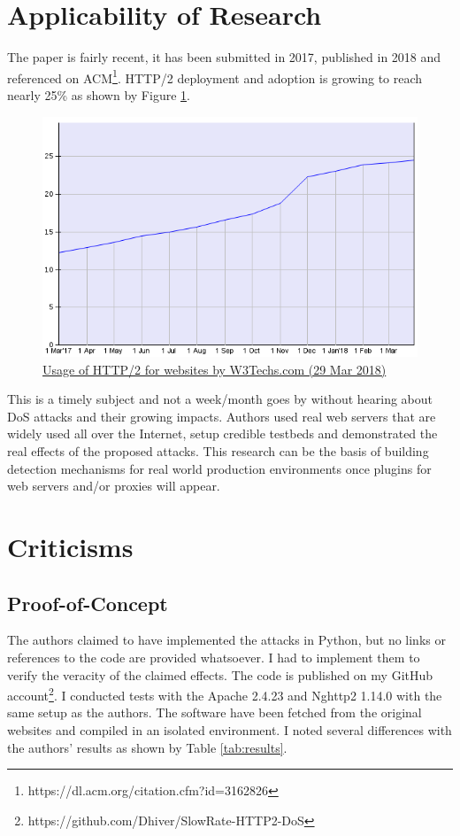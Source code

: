 \documentclass[11pt, a4paper]{article}
\begin{document}
\section{Applicability of Research}

The paper is fairly recent, it has been submitted in 2017, published in 2018 and referenced on ACM\footnote{https://dl.acm.org/citation.cfm?id=3162826}.
HTTP/2 deployment and adoption is growing to reach nearly 25\% as shown by Figure \ref{fig:h2adopt}.
\begin{figure}[ht]
	\centering
	\includegraphics[scale=0.6]{images/http2WebsitesUsage.png}
	\caption{\href{https://w3techs.com/technologies/details/ce-http2/all/all}{Usage of HTTP/2 for websites by W3Techs.com (29 Mar 2018)}}
	\label{fig:h2adopt}
\end{figure}
This is a timely subject and not a week/month goes by without hearing about DoS attacks and their growing impacts.
Authors used real web servers that are widely used all over the Internet, setup credible testbeds and demonstrated the real effects of the proposed attacks.
This research can be the basis of building detection mechanisms for real world production environments once plugins for web servers and/or proxies will appear.

\section{Criticisms}

\subsection{Proof-of-Concept}

The authors claimed to have implemented the attacks in Python, but no links or references to the code are provided whatsoever.
I had to implement them to verify the veracity of the claimed effects.
The code is published on my GitHub account\footnote{https://github.com/Dhiver/SlowRate-HTTP2-DoS}.
I conducted tests with the Apache 2.4.23 and Nghttp2 1.14.0 with the same setup as the authors.
The software have been fetched from the original websites and compiled in an isolated environment.
I noted several differences with the authors' results as shown by Table \ref{tab:results}.
\end{document}
